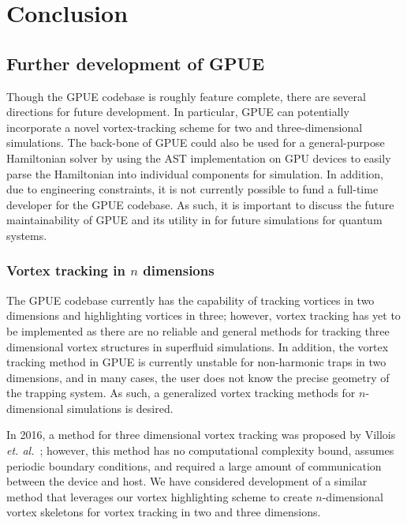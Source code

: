 \chapter*{Conclusion}
\label{ch:conclusion}

\section{Further development of GPUE}

Though the GPUE codebase is roughly feature complete, there are several directions for future development.
In particular, GPUE can potentially incorporate a novel vortex-tracking scheme for two and three-dimensional simulations.
The back-bone of GPUE could also be used for a general-purpose Hamiltonian solver by using the AST implementation on GPU devices to easily parse the Hamiltonian into individual components for simulation.
In addition, due to engineering constraints, it is not currently possible to fund a full-time developer for the GPUE codebase.
As such, it is important to discuss the future maintainability of GPUE and its utility in for future simulations for quantum systems.

\subsection{Vortex tracking in $n$ dimensions}

The GPUE codebase currently has the capability of tracking vortices in two dimensions and highlighting vortices in three; however, vortex tracking has yet to be implemented as there are no reliable and general methods for tracking three dimensional vortex structures in superfluid simulations.
In addition, the vortex tracking method in GPUE is currently unstable for non-harmonic traps in two dimensions, and in many cases, the user does not know the precise geometry of the trapping system.
As such, a generalized vortex tracking methods for $n$-dimensional simulations is desired.

In 2016, a method for three dimensional vortex tracking was proposed by Villois \textit{et. al.}~\cite{villois2016}; however, this method has no computational complexity bound, assumes periodic boundary conditions, and required a large amount of communication between the device and host.
We have considered development of a similar method that leverages our vortex highlighting scheme to create $n$-dimensional vortex skeletons for vortex tracking in two and three dimensions.

